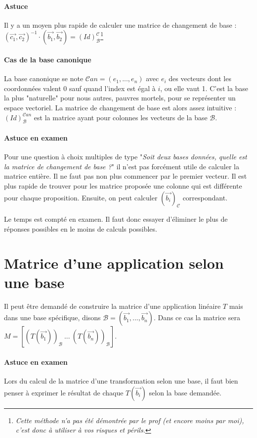 \documentclass[10pt,a4paper]{book}
\begin{document}
\paragraph{Astuce}
Il y a un moyen plus rapide de calculer une matrice de changement de base : $(\vec{c_1},\vec{c_2})^{-1}\cdot (\vec{b_1},\vec{b_2}) = (Id)^{\mathcal{C}}_{\mathcal{B}}$\footnote{\textit{Cette méthode n'a pas été démontrée par le prof (et encore moins par moi), c'est donc à utiliser à vos risques et périls.}}

\paragraph{Cas de la base canonique}
La base canonique se note $\mathcal{C}an = (e_1,...,e_n)$ avec $e_i$ des vecteurs dont les coordonnées valent 0 sauf quand l'index est égal à $i$, ou elle vaut 1. C'est la base la plus "naturelle" pour nous autres, pauvres mortels, pour se représenter un espace vectoriel. La matrice de changement de base est alors assez intuitive : $(Id)^{\mathcal{C}an}_{\mathcal{B}}$ est la matrice ayant pour colonnes les vecteurs de la base $\mathcal{B}$.

\paragraph{Astuce en examen}
Pour une question à choix multiples de type "\textit{Soit deux bases données, quelle est la matrice de changement de base ?}" il n'est pas forcément utile de calculer la matrice entière. Il ne faut pas non plus commencer par le premier vecteur. Il est plus rapide de trouver pour les matrice proposée une colonne qui est différente pour chaque proposition. Ensuite, on peut calculer $(\vec{b_i})_\mathcal{C}$ correspondant.\par 
Le temps est compté en examen. Il faut donc essayer d'éliminer le plus de réponses possibles en le moins de calculs possibles.

\section{Matrice d'une application selon une base}
Il peut être demandé de construire la matrice d'une application linéaire $T$ mais dans une base spécifique, disons $\mathcal{B}=(\vec{b_1},...,\vec{b_n})$. Dans ce cas la matrice sera $M = [(T(\vec{b_1}))_\mathcal{B}\ ...\ (T(\vec{b_n}))_\mathcal{B}]$.

\paragraph{Astuce en examen}
Lors du calcul de la matrice d'une transformation selon une base, il faut bien penser à exprimer le résultat de chaque $T(\vec{b_i})$ selon la base demandée.
\end{document}
